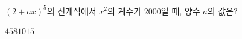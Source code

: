 $(2+ax)^5$의 전개식에서 $x^2$의 계수가 $2000$일 때, 양수 $a$의 값은?
\begin{choices32}{$4$}{$5$}{$8$}{$10$}{$15$}\end{choices32}
